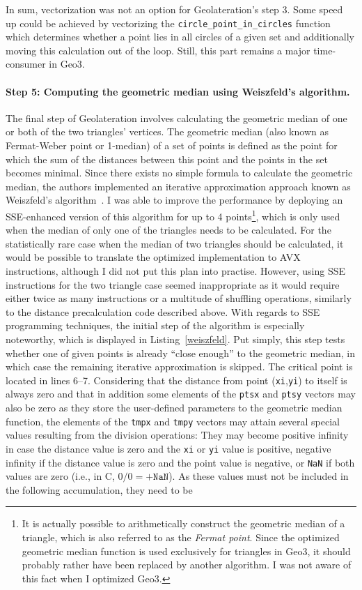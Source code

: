 In sum, vectorization was not an option for Geolateration's step 3. Some speed up could be achieved by vectorizing the \texttt{circle\_point\_in\_circles} function which determines whether a point lies in all circles of a given set and additionally moving this calculation out of the loop. Still, this part remains a major time-consumer in Geo3. 

\paragraph{Step 5: Computing the geometric median using Weiszfeld's algorithm.} The final step of Geolateration involves calculating the geometric median of one or both of the two triangles' vertices. The geometric median (also known as Fermat-Weber point or 1-median) of a set of points is defined as the point for which the sum of the distances between this point and the points in the set becomes minimal. Since there exists no simple formula to calculate the geometric median, the authors implemented an iterative approximation approach known as Weiszfeld's algorithm~\cite{weiszfeld2009minimum}. I was able to improve the performance by deploying an SSE-enhanced version of this algorithm for up to 4 points\footnote{It is actually possible to arithmetically construct the geometric median of a triangle, which is also referred to as the \emph{Fermat point}. Since the optimized geometric median function is used exclusively for triangles in Geo3, it should probably rather have been replaced by another algorithm. I was not aware of this fact when I optimized Geo3.}, which is only used when the median of only one of the triangles needs to be calculated. For the statistically rare case when the median of two triangles should be calculated, it would be possible to translate the optimized implementation to AVX instructions, although I did not put this plan into practise. However, using SSE instructions for the two triangle case seemed inappropriate as it would require either twice as many instructions or a multitude of shuffling operations, similarly to the distance precalculation code described above. With regards to SSE programming techniques, the initial step of the algorithm is especially noteworthy, which is displayed in Listing~\ref{weiszfeld}. Put simply, this step tests whether one of given points is already ``close enough'' to the geometric median, in which case the remaining iterative approximation is skipped. The critical point is located in lines 6--7. Considering that the distance from point (\texttt{xi},\texttt{yi}) to itself is always zero and that in addition some elements of the \texttt{ptsx} and \texttt{ptsy} vectors may also be zero as they store the user-defined parameters to the geometric median function, the elements of the \texttt{tmpx} and \texttt{tmpy} vectors may attain several special values resulting from the division operations: They may become positive infinity in case the distance value is zero and the \texttt{xi} or \texttt{yi} value is positive, negative infinity if the distance value is zero and the point value is negative, or \texttt{NaN} if both values are zero (i.e., in C, $0 / 0 = \texttt{+NaN}$). As these values must not be included in the following accumulation, they need to be 